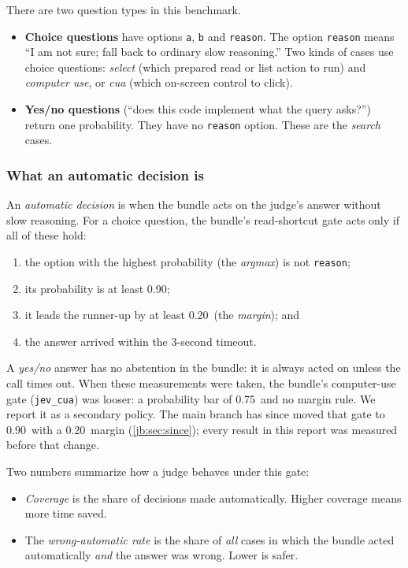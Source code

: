 \documentclass[11pt,letterpaper]{article}
\newcommand{\term}[1]{\emph{#1}}
\newcommand{\code}[1]{\texttt{#1}}
\newcommand{\CuaMinP}{0.75}
\newcommand{\MinMargin}{0.20}
\newcommand{\MinP}{0.90}
\newcommand{\TimeoutS}{3}
\begin{document}
There are two question types in this benchmark.
\begin{itemize}
  \item \textbf{Choice questions} have options \code{a}, \code{b} and \code{reason}. The option
    \code{reason} means ``I am not sure; fall back to ordinary slow reasoning.'' Two kinds of cases use
    choice questions: \emph{select} (which prepared read or list action to run) and \emph{computer use},
    or \emph{cua} (which on-screen control to click).
  \item \textbf{Yes/no questions} (``does this code implement what the query asks?'') return one
    probability. They have no \code{reason} option. These are the \emph{search} cases.
\end{itemize}

\subsubsection{What an automatic decision is}

An \term{automatic decision} is when the bundle acts on the judge's answer without slow reasoning.
For a choice question, the bundle's read-shortcut gate acts only if all of these hold:
\begin{enumerate}
  \item the option with the highest probability (the \term{argmax}) is not \code{reason};
  \item its probability is at least \MinP;
  \item it leads the runner-up by at least \MinMargin\ (the \term{margin}); and
  \item the answer arrived within the \TimeoutS-second timeout.
\end{enumerate}
A \emph{yes/no} answer has no abstention in the bundle: it is always acted on unless the call times
out. When these measurements were taken, the bundle's computer-use gate (\code{jev\_cua}) was looser:
a probability bar of \CuaMinP\ and no margin rule. We report it as a secondary policy. The main
branch has since moved that gate to \MinP\ with a \MinMargin\ margin (\cref{jb:sec:since}); every result
in this report was measured before that change.

Two numbers summarize how a judge behaves under this gate:
\begin{itemize}
  \item \term{Coverage} is the share of decisions made automatically. Higher coverage means more time
    saved.
  \item The \term{wrong-automatic rate} is the share of \emph{all} cases in which the bundle acted
    automatically \emph{and} the answer was wrong. Lower is safer.
\end{itemize}
\end{document}
